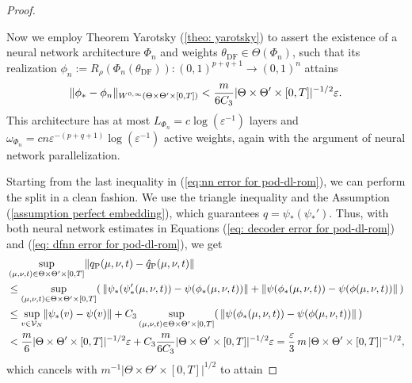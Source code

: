 \begin{proof}
\begin{enumerate}
        Now we employ Theorem Yarotsky (\ref{theo: yarotsky}) to assert the existence of a 
        neural network architecture $\Phi_n$ and
        weights $\theta_\text{DF} \in \Theta(\Phi_n)$, such that its 
        realization $\phi_n := R_\rho(\Phi_n(\theta_\text{DF})): 
        (0, 1)^{p+q+1} \to (0, 1)^n$ attains
        \begin{equation} \label{eq: dfnn error for pod-dl-rom}
            \lVert \phi_* - \phi_n \rVert_{W^{0, \infty}(\Theta \times \Theta' \times [0, T])}
            < \frac{m}{6 C_3}\lvert \Theta \times \Theta' \times [0, T] \rvert^{-1/2} \varepsilon.
        \end{equation}
        This architecture has at most $L_{\Phi_n} = c \log(\varepsilon^{-1})$ layers and 
        $\omega_{\Phi_n} = c n \varepsilon^{-(p+q+1)} \log(\varepsilon^{-1})$ active weights, again with
        the argument of neural network parallelization.
    \end{enumerate}
    Starting from the last inequality in (\ref{eq:nn error for pod-dl-rom}), we can perform the split in a clean fashion.
    We use the triangle inequality and the Assumption (\ref{assumption perfect embedding}), which
    guarantees $q = \psi_*(\psi_*')$.
    Thus, with both neural network estimates in Equations (\ref{eq: decoder error for pod-dl-rom})
    and (\ref{eq: dfnn error for pod-dl-rom}), we get
    \begin{align*}
        &\sup_{(\mu, \nu, t) \in \Theta \times \Theta' \times [0, T]} 
        \lVert q_\text{P}(\mu, \nu, t) - \hat{q}_\text{P}(\mu, \nu, t) \rVert \\
        &\leq \sup\limits_{(\mu, \nu, t) \in \Theta \times \Theta' \times [0, T]} 
            ( \, \lVert \psi_*(\psi_*'(\mu, \nu, t)) - \psi(\phi_*(\mu, \nu, t)) \rVert + 
            \lVert \psi(\phi_*(\mu, \nu, t)) - \psi(\phi(\mu, \nu, t)) \rVert \, )  \\
        &\leq 
            \sup\limits_{v \in \mathcal{V}_N} \lVert \psi_*(v) - \psi(v) \rVert + 
            C_3 \sup\limits_{(\mu, \nu, t) \in \Theta \times \Theta' \times [0, T]} 
            ( \, \lVert \psi(\phi_*(\mu, \nu, t)) - \psi(\phi(\mu, \nu, t)) \rVert \, )  \\
        &< \frac{m}{6}\lvert \Theta \times \Theta' \times [0, T] \rvert^{-1/2} \varepsilon + 
        C_3 \frac{m}{6 C_3}\lvert \Theta \times \Theta' \times [0, T] \rvert^{-1/2} \varepsilon = 
        \frac{\varepsilon}{3}\, m \,\lvert \Theta \times \Theta' \times [0, T] \rvert^{-1/2},
    \end{align*}
    which cancels with $m^{-1} \left| \Theta \times \Theta' \times [0, T] \right|^{1/2}$ to attain

\end{proof}
